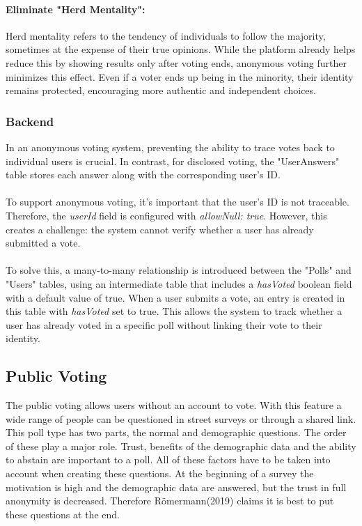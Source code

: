 \documentclass[a4paper,12pt]{report}
\begin{document}
\paragraph{Eliminate "Herd Mentality":}
Herd mentality refers to the tendency of individuals to follow the majority, sometimes at the expense of their true opinions. While the platform already helps reduce this by showing results only after voting ends, anonymous voting further minimizes this effect. Even if a voter ends up being in the minority, their identity remains protected, encouraging more authentic and independent choices. \parencite{disvsanon}

\subsubsection{Backend}
In an anonymous voting system, preventing the ability to trace votes back to individual users is crucial. In contrast, for disclosed voting, the "UserAnswers" table stores each answer along with the corresponding user's ID.\\ \\
To support anonymous voting, it's important that the user's ID is not traceable. Therefore, the \textit{userId} field is configured with \textit{allowNull: true}. However, this creates a challenge: the system cannot verify whether a user has already submitted a vote.\\ \\
To solve this, a many-to-many relationship is introduced between the "Polls" and "Users" tables, using an intermediate table that includes a \textit{hasVoted} boolean field with a default value of true. When a user submits a vote, an entry is created in this table with \textit{hasVoted} set to true. This allows the system to track whether a user has already voted in a specific poll without linking their vote to their identity. \\

\subsection{Public Voting}
The public voting allows users without an account to vote. With this feature a wide range of people can be questioned in street surveys or through a shared link. This poll type has two parts, the normal and demographic questions. The order of these play a major role. Trust, benefits of the demographic data and the ability to abstain are important to a poll. All of these factors have to be taken into account when creating these questions. At the beginning of a survey the motivation is high and the demographic data are answered, but the trust in full anonymity is decreased. Therefore Römermann(2019) claims it is best to put these questions at the end. \cite{demographicdata}
\end{document}

